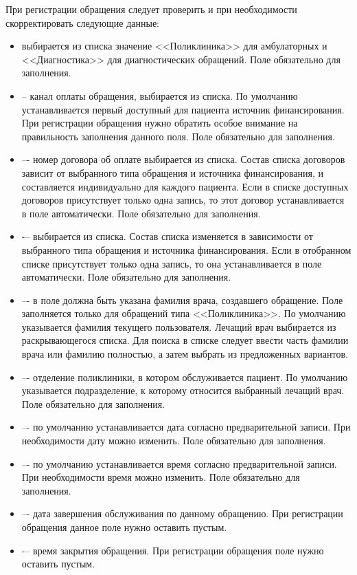 {При регистрации обращения следует проверить и при необходимости скорректировать следующие данные:
\begin{itemize}
	\item {} выбирается из списка значение <<Поликлиника>> для амбулаторных и <<Диагностика>> для диагностических обращений. Поле обязательно для заполнения.
	\item {} – канал оплаты обращения, выбирается из списка. По умолчанию устанавливается первый доступный для пациента источник финансирования. При регистрации обращения нужно обратить особое внимание на правильность заполнения данного поля. Поле обязательно для заполнения.
	\item {} –- номер договора об оплате выбирается из списка. Состав списка договоров зависит от выбранного типа обращения и источника финансирования, и составляется индивидуально для каждого пациента. Если в списке доступных договоров присутствует только одна запись, то этот договор устанавливается в поле автоматически. Поле обязательно для заполнения.
	\item {} -– выбирается из списка. Состав списка изменяется в зависимости от выбранного типа обращения и источника финансирования. Если в отобранном списке присутствует только одна запись, то она устанавливается в поле автоматически. Поле обязательно для заполнения.
	\item {} –- в поле должна быть указана фамилия врача, создавшего обращение. Поле заполняется только для обращений типа <<Поликлиника>>. По умолчанию указывается фамилия текущего пользователя. Лечащий врач выбирается из раскрывающегося списка. Для поиска в списке следует ввести часть фамилии врача или фамилию полностью, а затем выбрать из предложенных вариантов.
	\item {} –- отделение поликлиники, в котором обслуживается пациент. По умолчанию указывается подразделение, к которому относится выбранный лечащий врач. Поле обязательно для заполнения.
	\item {} –- по умолчанию устанавливается дата согласно предварительной записи. При необходимости дату можно изменить. Поле обязательно для заполнения.
	\item {} –- по умолчанию устанавливается время согласно предварительной записи. При необходимости время можно изменить. Поле обязательно для заполнения.
	\item {} –- дата завершения обслуживания по данному обращению. При регистрации обращения данное поле нужно оставить пустым.
	\item {} -– время закрытия обращения. При регистрации обращения поле нужно оставить пустым.
\end{itemize}

}

